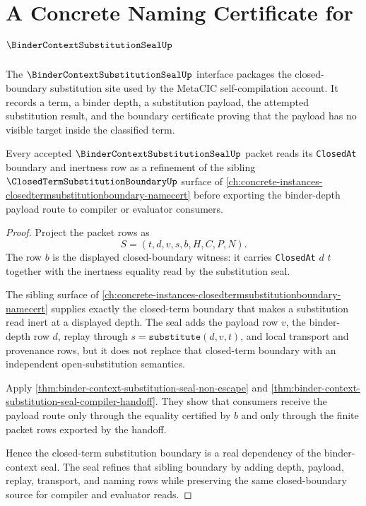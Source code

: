 \chapter{A Concrete Naming Certificate for $\BinderContextSubstitutionSealUp$}
\label{ch:concrete-instances-bindercontextsubstitutionseal-namecert}

The $\BinderContextSubstitutionSealUp$ interface packages the closed-boundary substitution site used by the MetaCIC self-compilation account. It records a term, a binder depth, a substitution payload, the attempted substitution result, and the boundary certificate proving that the payload has no visible target inside the classified term.

\begin{theorem}
\label{thm:binder-context-substitution-seal-closed-term-boundary-dependency}
Every accepted $\BinderContextSubstitutionSealUp$ packet reads its \texttt{ClosedAt} boundary and inertness row as a refinement of the sibling $\ClosedTermSubstitutionBoundaryUp$ surface of \autoref{ch:concrete-instances-closedtermsubstitutionboundary-namecert} before exporting the binder-depth payload route to compiler or evaluator consumers.
\end{theorem}
\begin{proof}
Project the packet rows as
$$
S=(t,d,v,s,b,H,C,P,N).
$$
The row $b$ is the displayed closed-boundary witness: it carries \texttt{ClosedAt} $d$ $t$ together with the inertness equality read by the substitution seal.

The sibling surface of \autoref{ch:concrete-instances-closedtermsubstitutionboundary-namecert} supplies exactly the closed-term boundary that makes a substitution read inert at a displayed depth. The seal adds the payload row $v$, the binder-depth row $d$, replay through $s=\texttt{substitute}(d,v,t)$, and local transport and provenance rows, but it does not replace that closed-term boundary with an independent open-substitution semantics.

Apply \autoref{thm:binder-context-substitution-seal-non-escape} and \autoref{thm:binder-context-substitution-seal-compiler-handoff}. They show that consumers receive the payload route only through the equality certified by $b$ and only through the finite packet rows exported by the handoff.

Hence the closed-term substitution boundary is a real dependency of the binder-context seal. The seal refines that sibling boundary by adding depth, payload, replay, transport, and naming rows while preserving the same closed-boundary source for compiler and evaluator reads.
\end{proof}

